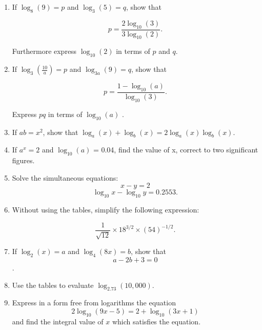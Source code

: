 \documentclass[a4paper,12pt]{article}
\begin{document}
\begin{enumerate}
\item If $\log_8(9) = p$  and $\log_3(5) = q$, show that 



\[p =  \frac{2\log_{10}(3)}{3\log_{10}(2)}. \] 

Furthermore express $\log_{10}(2)$ in terms of $p$ and $q$. 



\item If $\log_3\left(\frac{10}{a}\right) = p$ and $\log_{3a}(9) = q$, show that 

\[p =  \frac{1 - \log_{10}(a)}{\log_{10}(3)}. \] 

Express $pq$ in terms of $\log_{10}(a)$ .



\item If $ab = x^2$, show that $\log_a(x) + \log_b(x)  = 2\log_a(x) \log_b(x)$. 

\item If $a^x = 2$ and $\log_{10}(a)$ = 0.04, find the value of x, correct to two significant figures.     



 



\item Solve the simultaneous equations: $$x - y = 2$$ $$\log_{10}x - \log_{10}y = 0.2553.     $$







    \item Without using the tables, simplify the following expression:

\[ \frac{1}{\sqrt{12}} \times  18^{3/2} \times (54)^{-1/2}. \]

    \item If $\log_{2}(x)=a$  and $\log_{4}(8x) = b$, show that \[a - 2b + 3 = 0\]. \item  Use the tables to evaluate $\log_{2.73}(10,000)$.     

\item Express in a form free from logarithms the equation \[2 \log_{10}(9x - 5) = 2 + \log_{10}(3x + 1)\] and find the integral value of $x$ which satisfies the equation. 


\end{enumerate}
\end{document}
